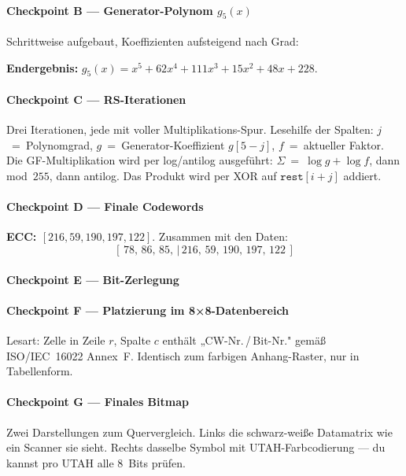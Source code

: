 \paragraph{Checkpoint B — Generator-Polynom $g_5(x)$}
Schrittweise aufgebaut, Koeffizienten aufsteigend nach Grad:



\textbf{Endergebnis:}
$g_5(x) = x^5 + 62 x^4 + 111 x^3 + 15 x^2 + 48 x + 228$.

\paragraph{Checkpoint C — RS-Iterationen}
Drei Iterationen, jede mit voller Multiplikations-Spur. Lesehilfe der
Spalten: $j$~=~Polynomgrad, $g$~=~Generator-Koeffizient
$g[5{-}j]$, $f$~=~aktueller Faktor. Die GF-Multiplikation wird per
log/antilog ausgeführt: $\Sigma~=~\log g + \log f$, dann mod~$255$,
dann antilog. Das Produkt wird per XOR auf $\texttt{rest}[i+j]$
addiert.



\paragraph{Checkpoint D — Finale Codewords}
\textbf{ECC: $[216, 59, 190, 197, 122]$}. Zusammen mit den Daten:
\[
  [\,78,\, 86,\, 85,\,|\,216,\, 59,\, 190,\, 197,\, 122\,]
\]

\paragraph{Checkpoint E — Bit-Zerlegung}



\paragraph{Checkpoint F — Platzierung im 8×8-Datenbereich}
Lesart: Zelle in Zeile $r$, Spalte $c$ enthält
„CW-Nr.\,/\,Bit-Nr." gemäß ISO/IEC~16022 Annex~F. Identisch zum
farbigen Anhang-Raster, nur in Tabellenform.



\paragraph{Checkpoint G — Finales Bitmap}
Zwei Darstellungen zum Quervergleich. Links die schwarz-weiße
Datamatrix wie ein Scanner sie sieht. Rechts dasselbe Symbol mit
UTAH-Farbcodierung — du kannst pro UTAH alle 8~Bits prüfen.

